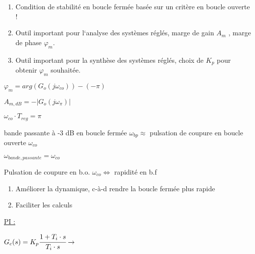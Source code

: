 
\hformbar

\newpage


\begin{enumerate}
    \item Condition de stabilité en boucle fermée basée sur un critère en boucle ouverte !
    \item Outil important pour l‘analyse des systèmes réglés, marge de gain $A_m$ , marge de phase $\varphi_m$.
    \item Outil important pour la synthèse des systèmes réglés, choix de $K_p$ pour obtenir $\varphi_m$ souhaitée.
\end{enumerate}

$\varphi_m = arg(G_o(j\omega_{co}))- (-\pi)$ \quad [rad]

\vspace{3mm}

$A_{m,dB} = -|G_o(j\omega_{\pi})| $\quad  [dB]

\vspace{3mm}

$\omega_{co} \cdot T_{reg} = \pi$


bande passante à -3 dB en boucle fermée $\omega_{bp} \approx$ pulsation de coupure en boucle ouverte $\omega_{co}$

$\omega_{bande,passante} = \omega_{co}$

Pulsation de coupure en b.o. $\omega_{co} \Leftrightarrow $ rapidité en b.f

\hformbar


\begin{enumerate}
    \item Améliorer la dynamique, c-à-d rendre la boucle fermée plus rapide
    \item Faciliter les calculs
\end{enumerate}



\vspace{2mm}

\underline{PI :}

\vspace{2mm}

{\noindent$G_c(s) = K_p \cfrac{1+T_i \cdot s}{T_i \cdot s} \rightarrow$}


